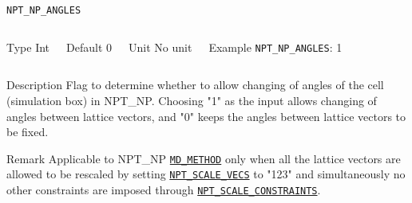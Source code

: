 \begin{frame}[allowframebreaks]{\texttt{NPT\_NP\_ANGLES}} \label{NPT_NP_ANGLES}
\vspace*{-12pt}
\begin{columns}
\begin{block}{Type}
Int
\end{block}

\begin{block}{Default}
0
\end{block}

\begin{block}{Unit}
No unit
\end{block}

\begin{block}{Example}
\texttt{NPT\_NP\_ANGLES}: 1
\end{block}
\end{columns}

\begin{block}{Description}
Flag to determine whether to allow changing of angles of the cell (simulation box) in NPT\_NP. Choosing "1" as the input allows changing of angles between lattice vectors, and "0" keeps the angles between lattice vectors to be fixed.
\end{block}

\begin{block}{Remark}
Applicable to NPT\_NP \hyperlink{MD_METHOD}{\texttt{MD\_METHOD}} only when all the lattice vectors are allowed to be rescaled by setting \hyperlink{NPT\_SCALE\_VECS}{\texttt{NPT\_SCALE\_VECS}} to "123" and simultaneously no other constraints are imposed through \hyperlink{NPT\_SCALE\_CONSTRAINTS}{\texttt{NPT\_SCALE\_CONSTRAINTS}}.
\end{block}

\end{frame}



